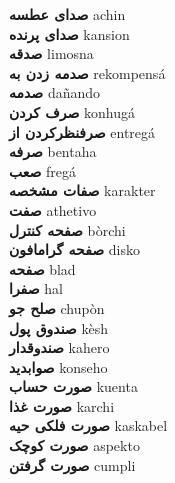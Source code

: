 \textbf{ صدای عطسه  } achin \\
\textbf{ صدای پرنده  } kansion \\
\textbf{ صدقه  } limosna \\
\textbf{ صدمه زدن به  } rekompensá \\
\textbf{ صدمه  } dañando \\
\textbf{ صرف کردن  } konhugá \\
\textbf{ صرفنظرکردن از  } entregá \\
\textbf{ صرفه  } bentaha \\
\textbf{ صعب  } fregá \\
\textbf{ صفات مشخصه  } karakter \\
\textbf{ صفت  } athetivo \\
\textbf{ صفحه کنترل  } bòrchi \\
\textbf{ صفحه گرامافون  } disko \\
\textbf{ صفحه  } blad \\
\textbf{ صفرا  } hal \\
\textbf{ صلح جو  } chupòn \\
\textbf{ صندوق پول  } kèsh \\
\textbf{ صندوقدار  } kahero \\
\textbf{ صوابدید  } konseho \\
\textbf{ صورت حساب  } kuenta \\
\textbf{ صورت غذا  } karchi \\
\textbf{ صورت فلکی حیه  } kaskabel \\
\textbf{ صورت کوچک  } aspekto \\
\textbf{ صورت گرفتن  } cumpli \\
